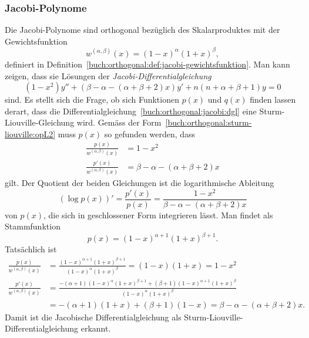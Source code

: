 \subsubsection{Jacobi-Polynome}
Die Jacobi-Polynome sind orthogonal bezüglich des Skalarproduktes
%
%
mit der Gewichtsfunktion
\[
w^{(\alpha,\beta)}(x) = (1-x)^\alpha(1+x)^\beta,
\]
definiert in Definition~\ref{buch:orthogonal:def:jacobi-gewichtsfunktion}.
Man kann zeigen, dass sie Lösungen der
{\em Jacobi-Diffe\-ren\-tial\-gleichung}
%
%
\begin{equation}
(1-x^2)y'' + (\beta-\alpha-(\alpha+\beta + 2)x)y' + n(n+\alpha+\beta+1)y=0
\label{buch:orthogonal:jacobi:dgl}
\end{equation}
sind.
Es stellt sich die Frage, ob sich Funktionen $p(x)$ und $q(x)$ finden lassen
derart, dass die Differentialgleichung~\eqref{buch:orthogonal:jacobi:dgl}
eine Sturm-Liouville-Gleichung wird.
Gemäss der Form~\eqref{buch:orthogonal:sturm-liouville:opL2} muss
$p(x)$ so gefunden werden, dass
\begin{align*}
\frac{p(x)}{w^{(\alpha,\beta)}(x)} &= 1-x^2 \\
\frac{p'(x)}{w^{(\alpha,\beta)}(x)} &= \beta-\alpha-(\alpha+\beta+2)x
\end{align*}
gilt.
Der Quotient der beiden Gleichungen ist die logarithmische Ableitung
\[
(\log p(x))'
=
\frac{p'(x)}{p(x)}
=
\frac{1-x^2}{\beta-\alpha-(\alpha+\beta+2)x}
\]
von $p(x)$,
die sich in geschlossener Form integrieren lässt.
Man findet als Stammfunktion
\[
p(x)
=
(1-x)^{\alpha+1}(1+x)^{\beta+1}.
\]
Tatsächlich ist
\begin{align*}
\frac{p(x)}{w^{(\alpha,\beta)}(x)}
&=
\frac{(1-x)^{\alpha+1}(1+x)^{\beta+1}}{(1-x)^\alpha(1+x)^\beta}
=
(1-x)(1+x)=1-x^2
\\
\frac{p'(x)}{w^{(\alpha,\beta)}(x)}
&=
\frac{
-(\alpha+1)
(1-x)^{\alpha}(1+x)^{\beta+1}
+
(\beta+1)
(1-x)^{\alpha+1}(1+x)^{\beta}
}{
(1-x)^{\alpha}(1+x)^{\beta}
}
\\
&=
-(\alpha+1)(1+x) + (\beta+1)(1-x)
=
\beta-\alpha-(\alpha+\beta+2)x.
\end{align*}
Damit ist
die Jacobische Differentialgleichung 
als Sturm-Liouville-Differentialgleichung erkannt.

%
%
